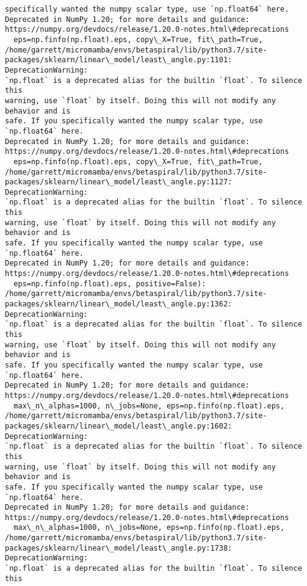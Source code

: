\documentclass[11pt]{article}
\begin{document}
\begin{Verbatim}[commandchars=\\\{\}]
specifically wanted the numpy scalar type, use `np.float64` here.
Deprecated in NumPy 1.20; for more details and guidance:
https://numpy.org/devdocs/release/1.20.0-notes.html\#deprecations
  eps=np.finfo(np.float).eps, copy\_X=True, fit\_path=True,
/home/garrett/micromamba/envs/betaspiral/lib/python3.7/site-
packages/sklearn/linear\_model/least\_angle.py:1101: DeprecationWarning:
`np.float` is a deprecated alias for the builtin `float`. To silence this
warning, use `float` by itself. Doing this will not modify any behavior and is
safe. If you specifically wanted the numpy scalar type, use `np.float64` here.
Deprecated in NumPy 1.20; for more details and guidance:
https://numpy.org/devdocs/release/1.20.0-notes.html\#deprecations
  eps=np.finfo(np.float).eps, copy\_X=True, fit\_path=True,
/home/garrett/micromamba/envs/betaspiral/lib/python3.7/site-
packages/sklearn/linear\_model/least\_angle.py:1127: DeprecationWarning:
`np.float` is a deprecated alias for the builtin `float`. To silence this
warning, use `float` by itself. Doing this will not modify any behavior and is
safe. If you specifically wanted the numpy scalar type, use `np.float64` here.
Deprecated in NumPy 1.20; for more details and guidance:
https://numpy.org/devdocs/release/1.20.0-notes.html\#deprecations
  eps=np.finfo(np.float).eps, positive=False):
/home/garrett/micromamba/envs/betaspiral/lib/python3.7/site-
packages/sklearn/linear\_model/least\_angle.py:1362: DeprecationWarning:
`np.float` is a deprecated alias for the builtin `float`. To silence this
warning, use `float` by itself. Doing this will not modify any behavior and is
safe. If you specifically wanted the numpy scalar type, use `np.float64` here.
Deprecated in NumPy 1.20; for more details and guidance:
https://numpy.org/devdocs/release/1.20.0-notes.html\#deprecations
  max\_n\_alphas=1000, n\_jobs=None, eps=np.finfo(np.float).eps,
/home/garrett/micromamba/envs/betaspiral/lib/python3.7/site-
packages/sklearn/linear\_model/least\_angle.py:1602: DeprecationWarning:
`np.float` is a deprecated alias for the builtin `float`. To silence this
warning, use `float` by itself. Doing this will not modify any behavior and is
safe. If you specifically wanted the numpy scalar type, use `np.float64` here.
Deprecated in NumPy 1.20; for more details and guidance:
https://numpy.org/devdocs/release/1.20.0-notes.html\#deprecations
  max\_n\_alphas=1000, n\_jobs=None, eps=np.finfo(np.float).eps,
/home/garrett/micromamba/envs/betaspiral/lib/python3.7/site-
packages/sklearn/linear\_model/least\_angle.py:1738: DeprecationWarning:
`np.float` is a deprecated alias for the builtin `float`. To silence this

\end{Verbatim}
\end{document}
